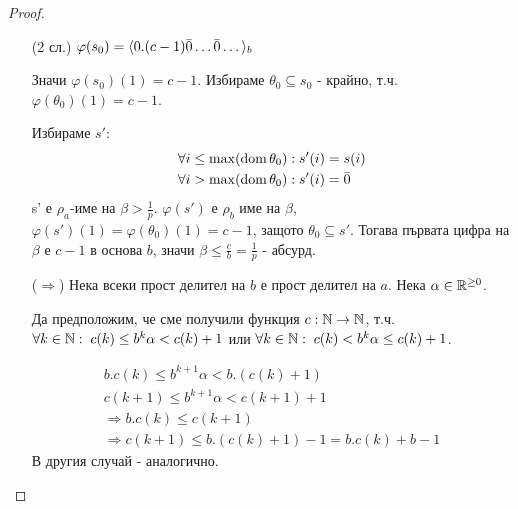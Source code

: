 \begin{proof}
\begin{itemize}
\begin{itemize}
            \item[(2 сл.)] $\varphi(s_0) = \langle0.(c-1)\Bar{0}\dots\Bar{0}\dots\rangle_b$
    
            Значи $\varphi(s_0)(1) = c - 1$. Избираме $\theta_0 \subseteq s_0$ - крайно, т.ч. $\varphi(\theta_0)(1) = c - 1$.
    
            Избираме $s'$:
            \begin{equation}
                \begin{split}
                    \forall i \leq \max(\operatorname*{dom}\theta_0):\;& s'(i) = s(i)\\
                    \forall i > \max(\operatorname*{dom}\theta_0):\;& s'(i) = \Bar{0}
                \end{split}
            \end{equation}
            s' е $\rho_a$-име на $\beta > \frac{1}{p}$. $\varphi(s')$ е $\rho_b$ име на $\beta$, $\varphi(s')(1)  =\varphi(\theta_0)(1) = c - 1$, защото $\theta_0 \subseteq s'$. Тогава първата цифра на $\beta$ е $c - 1$ в основа $b$, значи $\beta \leq \frac{c}{b} = \frac{1}{p}$ - абсурд.
            
            \item[($\Rightarrow$)] Нека всеки прост делител на $b$ е прост делител на $a$. Нека $\alpha \in {\mathbb{R}}^{\geq 0}$. 
            
            Да предположим, че сме получили функция $c: {\mathbb{N}} \to {\mathbb{N}}$, т.ч. $\forall k\in{\mathbb{N}}:\; c(k) \leq b^k \alpha < c(k) + 1$ или $\forall k\in{\mathbb{N}}:\; c(k) < b^k \alpha \leq c(k) + 1$.

            \begin{equation}
                \begin{split}
                    b.c(k) \leq b^{k+1} \alpha < b.(c(k) + 1) \\
                    c(k+1) \leq b^{k+1} \alpha < c(k+1) + 1 \\
                    \Rightarrow b.c(k) \leq c(k+1) \\
                    \Rightarrow c(k+1) \leq b.(c(k) + 1) - 1 = b.c(k) + b - 1
                \end{split}
            \end{equation}
            В другия случай - аналогично.


\end{itemize}
\end{itemize}
\end{proof}
